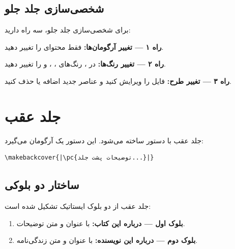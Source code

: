 
\subsection{شخصی‌سازی جلد جلو}
\label{sec:cover-front-custom}

برای شخصی‌سازی جلد جلو، سه راه دارید:

\textbf{راه ۱ — تغییر آرگومان‌ها:} فقط محتوای
 را تغییر دهید.

\textbf{راه ۲ — تغییر رنگ‌ها:} در
، رنگ‌های
، ، 
و  را تغییر دهید.

\textbf{راه ۳ — تغییر طرح:} فایل
 را ویرایش کنید و
عناصر جدید اضافه یا حذف کنید.


\section{جلد عقب}
\label{sec:cover-back}

جلد عقب با دستور  ساخته
می‌شود. این دستور یک آرگومان می‌گیرد:

\begin{latin}
\begin{verbatim}
\makebackcover{|\pc{توضیحات پشت جلد...}|}
\end{verbatim}
\end{latin}


\subsection{ساختار دو بلوکی}
\label{sec:cover-back-two-blocks}

جلد عقب  از دو بلوک ایستاتیک
تشکیل شده است:

\begin{enumerate}
    \item \textbf{بلوک اول — درباره این کتاب:}
    با عنوان  و متن
    توضیحات.
    \item \textbf{بلوک دوم — درباره این نویسنده:}
    با عنوان  و
    متن زندگی‌نامه.
\end{enumerate}

